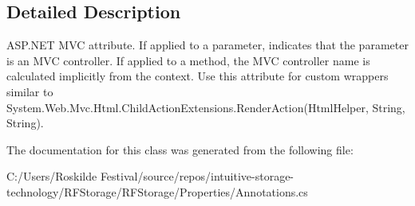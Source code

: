 \subsection{Detailed Description}
A\+S\+P.\+N\+ET M\+VC attribute. If applied to a parameter, indicates that the parameter is an M\+VC controller. If applied to a method, the M\+VC controller name is calculated implicitly from the context. Use this attribute for custom wrappers similar to {\ttfamily System.\+Web.\+Mvc.\+Html.\+Child\+Action\+Extensions.\+Render\+Action(\+Html\+Helper, String, String)}. 



The documentation for this class was generated from the following file\+:\begin{DoxyCompactItemize}
\item 
C\+:/\+Users/\+Roskilde Festival/source/repos/intuitive-\/storage-\/technology/\+R\+F\+Storage/\+R\+F\+Storage/\+Properties/Annotations.\+cs\end{DoxyCompactItemize}
